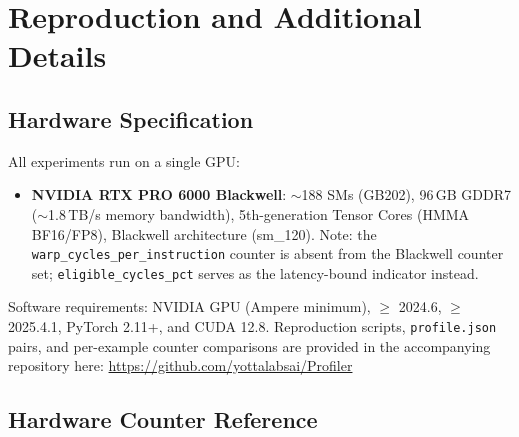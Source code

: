 \section{Reproduction and Additional Details}
\label{sec:appendix:exp}

\subsection{Hardware Specification}
\label{sec:appendix:hwspec}

All experiments run on a single GPU:
\begin{itemize}[leftmargin=1.5em]
  \item \textbf{NVIDIA RTX PRO 6000 Blackwell}: ${\sim}$188 SMs (GB202),
    96\,GB GDDR7 (${\sim}$1.8\,TB/s memory bandwidth),
    5th-generation Tensor Cores (HMMA BF16/FP8), Blackwell architecture (sm\_120).
    Note: the \texttt{warp\_cycles\_per\_instruction} counter is absent from the
    Blackwell counter set; \texttt{eligible\_\allowbreak cycles\_pct} serves as the
    latency-bound indicator instead.
\end{itemize}

Software requirements: NVIDIA GPU (Ampere minimum), \nsys $\ge$ 2024.6,
\ncu $\ge$ 2025.4.1, PyTorch 2.11+, and CUDA 12.8.
Reproduction scripts, \texttt{profile.json} pairs, and per-example counter comparisons are provided in the accompanying repository here: 
\url{https://github.com/yottalabsai/Profiler}

\subsection{Hardware Counter Reference}
\label{sec:appendix:counters}

